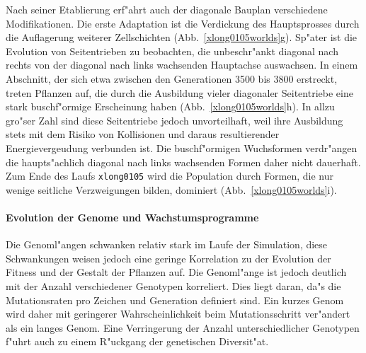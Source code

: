Nach seiner Etablierung erf"ahrt auch der diagonale Bauplan verschiedene Modifikationen.
Die erste Adaptation ist die Verdickung des Hauptsprosses durch die Auflagerung weiterer
Zellschichten (Abb.\ \ref{xlong0105worlds}g). Sp"ater ist die Evolution von Seitentrieben zu beobachten,
die unbeschr"ankt diagonal nach rechts von der diagonal nach links wachsenden Hauptachse auswachsen.
In einem Abschnitt, der sich etwa zwischen den Generationen 3500 bis 3800 erstreckt, treten Pflanzen
auf, die durch die Ausbildung vieler diagonaler Seitentriebe eine stark buschf"ormige Erscheinung
haben (Abb.\ \ref{xlong0105worlds}h).
In allzu gro"ser Zahl sind diese Seitentriebe jedoch unvorteilhaft, weil ihre Ausbildung stets mit dem
Risiko von Kollisionen und daraus resultierender Energievergeudung verbunden ist. Die buschf"ormigen
Wuchsformen verdr"angen die haupts"achlich diagonal nach links wachsenden Formen daher nicht dauerhaft.
Zum Ende des Laufs \verb|xlong0105| wird die Population durch Formen, die nur wenige seitliche
Verzweigungen bilden, dominiert (Abb.\ \ref{xlong0105worlds}i).


\paragraph{Evolution der Genome und Wachstumsprogramme}
\label{xlong0105-geno}

Die Genoml"angen schwanken relativ stark im Laufe der Simulation, diese Schwankungen weisen jedoch
eine geringe Korrelation zu der Evolution der Fitness und der Gestalt der Pflanzen auf. Die Genoml"ange
ist jedoch deutlich mit der Anzahl verschiedener Genotypen korreliert. Dies liegt daran, da"s die
Mutationsraten pro Zeichen und Generation definiert sind. Ein kurzes Genom wird daher mit geringerer
Wahrscheinlichkeit beim Mutationsschritt ver"andert als ein langes Genom. Eine Verringerung der
Anzahl unterschiedlicher Genotypen f"uhrt auch zu einem R"uckgang der genetischen Diversit"at.


